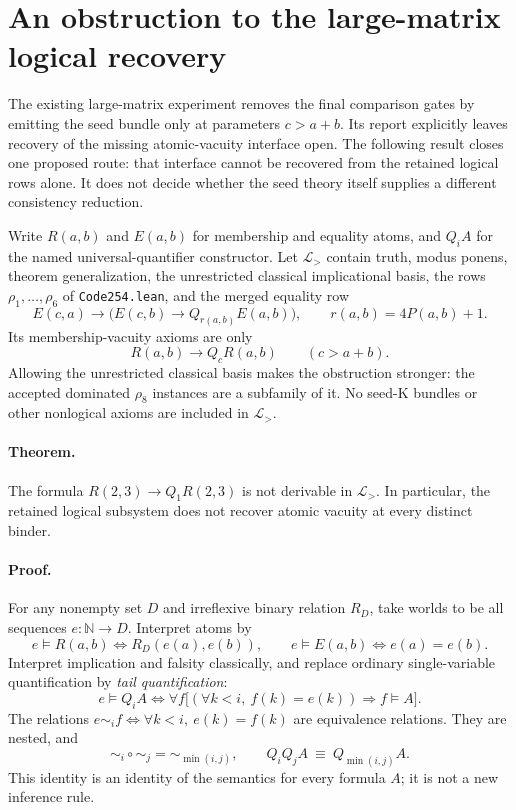 \section{An obstruction to the large-matrix logical recovery}
\label{sec:tail-quantifier-obstruction}

The existing large-matrix experiment removes the final comparison gates by
emitting the seed bundle only at parameters $c>a+b$. Its report explicitly
leaves recovery of the missing atomic-vacuity interface open. The following
result closes one proposed route: that interface cannot be recovered from
the retained logical rows alone. It does not decide whether the seed theory
itself supplies a different consistency reduction.

Write $R(a,b)$ and $E(a,b)$ for membership and equality atoms, and
$Q_i A$ for the named universal-quantifier constructor. Let
$\mathcal L_{>}$ contain truth, modus ponens, theorem generalization, the
unrestricted classical implicational basis, the rows $\rho_1,\ldots,\rho_6$
of \texttt{Code254.lean}, and the merged equality row
\[
 E(c,a)\to\bigl(E(c,b)\to Q_{r(a,b)}E(a,b)\bigr),
 \qquad r(a,b)=4P(a,b)+1.
\]
Its membership-vacuity axioms are only
\[
 R(a,b)\to Q_cR(a,b) \qquad(c>a+b).
\]
Allowing the unrestricted classical basis makes the obstruction stronger:
the accepted dominated $\rho_8$ instances are a subfamily of it.
No seed-K bundles or other nonlogical axioms are included in
$\mathcal L_{>}$.

\paragraph{Theorem.}
The formula $R(2,3)\to Q_1R(2,3)$ is not derivable in
$\mathcal L_{>}$. In particular, the retained logical subsystem does not
recover atomic vacuity at every distinct binder.

\paragraph{Proof.}
For any nonempty set $D$ and irreflexive binary relation $R_D$, take worlds
to be all sequences $e:\mathbb N\to D$. Interpret atoms by
\[
 e\models R(a,b)\iff R_D(e(a),e(b)),\qquad
 e\models E(a,b)\iff e(a)=e(b).
\]
Interpret implication and falsity classically, and replace ordinary
single-variable quantification by \emph{tail quantification}:
\[
 e\models Q_i A
 \iff
 \forall f\bigl[(\forall k<i,\ f(k)=e(k))\Longrightarrow f\models A\bigr].
\]
The relations $e\sim_i f\iff\forall k<i,\ e(k)=f(k)$ are equivalence
relations. They are nested, and
\[
 \sim_i\circ\sim_j=\sim_{\min(i,j)},\qquad
 Q_iQ_jA\ \equiv\ Q_{\min(i,j)}A.
\]
This identity is an identity of the semantics for every formula $A$;
it is not a new inference rule.


